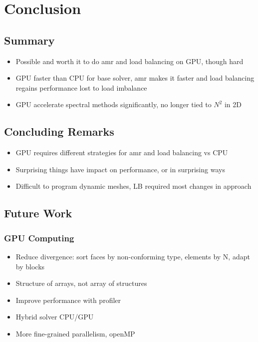 \chapter{Conclusion}\label{chapter:conclusion}

\section{Summary}\label{section:conclusion:summary}

\begin{itemize}
    \item Possible and worth it to do amr and load balancing on GPU, though hard
    \item GPU faster than CPU for base solver, amr makes it faster and load balancing regains performance lost to load imbalance
    \item GPU accelerate spectral methods significantly, no longer tied to \(N^2\) in 2D
\end{itemize}

\section{Concluding Remarks}\label{section:conclusion:remarks}

\begin{itemize}
    \item GPU requires different strategies for amr and load balancing vs CPU
    \item Surprising things have impact on performance, or in surprising ways
    \item Difficult to program dynamic meshes, LB required most changes in approach
\end{itemize}

\section{Future Work}\label{section:conclusion:future_work}

\subsection{GPU Computing}\label{subsection:conclusion:future_work:gpu}

\begin{itemize}
    \item Reduce divergence: sort faces by non-conforming type, elements by N, adapt by blocks
    \item Structure of arrays, not array of structures
    \item Improve performance with profiler
    \item Hybrid solver CPU/GPU
    \item More fine-grained parallelism, openMP
\end{itemize}

